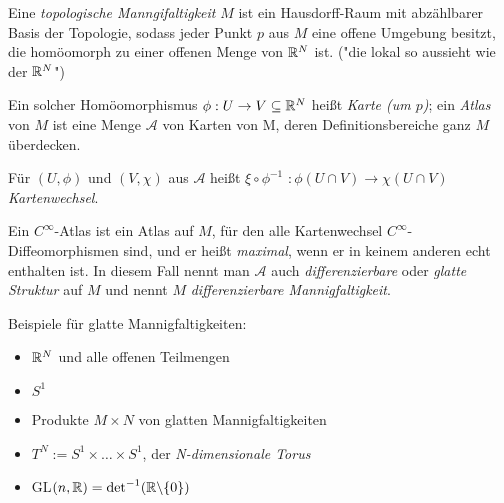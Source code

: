 \begin{defi}
Eine \emph{topologische Manngifaltigkeit} $M$ ist ein Hausdorff-Raum mit abzählbarer Basis der Topologie, sodass jeder Punkt $p$ aus $M$ eine offene Umgebung besitzt, die homöomorph zu einer offenen Menge von $\mathbb R^N$ ist. ("die lokal so aussieht wie der $\mathbb R^N$")
\end{defi}

\begin{defi}
Ein solcher Homöomorphismus $\phi: U \to V \subseteq \mathbb R^N$ heißt \emph{Karte (um $p$)}; ein \emph{Atlas} von $M$ ist eine Menge $\mathcal{A}$ von Karten von M, deren Definitionsbereiche ganz $M$ überdecken.
\end{defi}

\begin{defi}[Kartenwechsel]
Für $(U, \phi)$ und $(V, \chi)$ aus $\mathcal{A}$ heißt \underline{$\xi \circ \phi^{-1}$} $: \phi(U \cap V) \to \chi(U \cap V)$ \emph{Kartenwechsel}.
\end{defi}

\begin{defi}
Ein $C^{\infty}$-Atlas ist ein Atlas auf $M$, für den alle Kartenwechsel $C^{\infty}$-Diffeomorphismen sind, und er heißt \emph{maximal}, wenn er in keinem anderen echt enthalten ist.
In diesem Fall nennt man $\mathcal{A}$ auch \emph{differenzierbare} oder \emph{glatte Struktur} auf $M$ und nennt $M$ \emph{differenzierbare Mannigfaltigkeit}.
\end{defi}

\begin{bsp} Beispiele für glatte Mannigfaltigkeiten:
\begin{itemize}
	\item $\mathbb R^N$ und alle offenen Teilmengen
	\item $S^1$
	\item Produkte $M \times N$ von glatten Mannigfaltigkeiten
	\item $T^N := S^1 \times \dots \times S^1$, der \emph{N-dimensionale Torus}
	\item GL$(n, \mathbb R) = \det^{-1}(\mathbb R \backslash \{0\})$
\end{itemize}	
\end{bsp}
